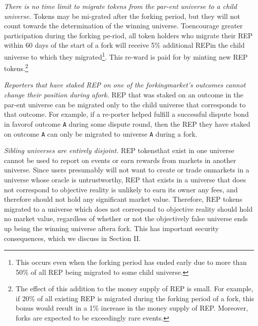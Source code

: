 \documentclass[12pt,floatfix,reprint,nofootinbib,amsmath,amssymb,epsfig,pre,floats,letterpaper,groupedaffiliation]{revtex4-1}
\theoremstyle{definition}
\theoremstyle{definition}
\begin{document}
\textit{There is no time limit to migrate tokens from the par-\linebreak ent universe to a child universe.} Tokens may be mi-\linebreak grated after the forking period, but they will not count towards the determination of the winning universe. To\linebreak encourage greater participation during the forking pe-\linebreak riod, all token holders who migrate their REP within 60 days of the start of a fork will receive 5\% additional REP\linebreak in the child universe to which they migrated\footnote{This occurs even when the forking period has ended early due to more than 50\% of all REP being migrated to some child universe.}. This re-\linebreak ward is paid for by minting new REP tokens.\footnote{The effect of this addition to the money supply of REP is small. For example, if 20\% of all existing REP is migrated during the forking period of a fork, this bonus would result in a 1\% increase in the money supply of REP. Moreover, forks are expected to be exceedingly rare events.}

\textit{Reporters that have staked REP on one of the forking\linebreak market's outcomes cannot change their position during a\linebreak fork.} REP that was staked on an outcome in the par-\linebreak ent universe can be migrated only to the child universe that corresponds to that outcome. For example, if a re-\linebreak porter helped fulfill a successful dispute bond in favor\linebreak of outcome \texttt{A} during some dispute round, then the REP they have staked on outcome \texttt{A} can only be migrated to universe \texttt{A} during a fork.

\textit{Sibling universes are entirely disjoint.} REP tokens\linebreak that exist in one universe cannot be used to report on events or earn rewards from markets in another universe. Since users presumably will not want to create or trade on\linebreak markets in a universe whose oracle is untrustworthy, REP that exists in a universe that does not correspond to objective reality is unlikely to earn its owner any fees, and therefore should not hold any significant market value. Therefore, REP tokens migrated to a universe which does not correspond to objective reality should hold no market value, regardless of whether or not the objectively false universe ends up being the winning universe after\linebreak a fork. This has important security consequences, which we discuss in Section II.
\end{document}
